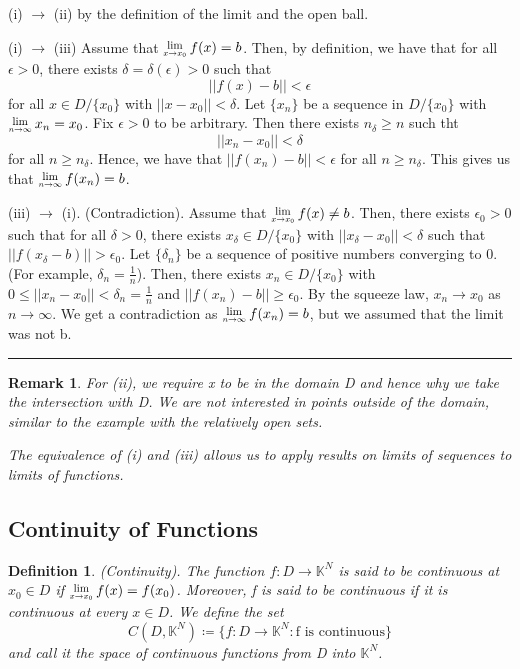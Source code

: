 \documentclass[twoside]{article}
\newcommand{\Lim}[1]{\raisebox{0.5ex}{\scalebox{0.8}{$\displaystyle \lim_{#1}\;$}}}
\newtheorem{remark}[theorem]{Remark}
\newtheorem{definition}[theorem]{Definition}
\newenvironment{proof}{{\bf Proof:}}{\hfill\rule{2mm}{2mm}}
\begin{document}
\begin{proof}
(i) $\rightarrow$ (ii) by the definition of the limit and the open ball.

(i) $\rightarrow$ (iii) Assume that $\Lim{x \rightarrow x_0}f(x) = b$. Then, by definition, we have that for all $\epsilon > 0$, there exists $\delta = \delta(\epsilon) > 0$ such that
$$
||f(x) - b|| < \epsilon
$$
for all $x \in D/\{x_0\}$ with $||x-x_0|| < \delta$. Let $\{x_n\}$ be a sequence in $D/\{x_0\}$ with $\Lim{n \rightarrow \infty}x_n = x_0$. Fix $\epsilon > 0$ to be arbitrary. Then there exists $n_{\delta} \geq n$ such tht 
$$
||x_n - x_0|| < \delta
$$
for all $n \geq n_{\delta}$. Hence, we have that $||f(x_n) - b|| < \epsilon$ for all $n \geq n_{\delta}$. This gives us that $\Lim{n \rightarrow \infty}f(x_n) = b$.

(iii) $\rightarrow$ (i). (Contradiction). Assume that $\Lim{x \rightarrow x_0}f(x) \neq b$. Then, there exists $\epsilon_{0} > 0$ such that for all $\delta > 0$, there exists $x_{\delta} \in D/\{x_0\}$ with $||x_{\delta} - x_0|| < \delta$ such that $||f(x_{\delta} - b)|| > \epsilon_0$. Let $\{\delta_n\}$ be a sequence of positive numbers converging to 0. (For example, $\delta_n = \frac{1}{n}$). Then, there exists $x_n \in D/\{x_0\}$ with $0 \leq ||x_n - x_0|| < \delta_n = \frac{1}{n}$ and $||f(x_n) - b|| \geq \epsilon_0$. By the squeeze law, $x_n \rightarrow x_0$ as $n \rightarrow \infty$. We get a contradiction as $\Lim{n \rightarrow \infty}f(x_n) = b$, but we assumed that the limit was not b.
\end{proof}

\begin{remark}
For (ii), we require x to be in the domain D and hence why we take the intersection with D. We are not interested in points outside of the domain, similar to the example with the relatively open sets.

The equivalence of (i) and (iii) allows us to apply results on limits of sequences to limits of functions.
\end{remark}

\subsection{Continuity of Functions}

\begin{definition}(Continuity). The function $f: D \rightarrow \mathbb{K}^N$ is said to be continuous at $x_0 \in D$ if $\Lim{x \rightarrow x_0}f(x) = f(x_0)$. Moreover, f is said to be continuous if it is continuous at every $x \in D$. We define the set
$$
C(D, \mathbb{K}^N) \coloneqq \{f: D \rightarrow \mathbb{K}^N: \text{f is continuous}\}
$$
and call it the space of continuous functions from D into $\mathbb{K}^N$.
\end{definition}
\end{document}
